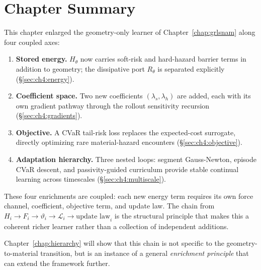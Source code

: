 \section{Chapter Summary}
\label{sec:ch4:summary}

This chapter enlarged the geometry-only learner of
Chapter~\ref{chap:grlsnam} along four coupled axes:

\begin{enumerate}
  \item \textbf{Stored energy.}
        $H_\theta$ now carries soft-risk and hard-hazard barrier terms
        in addition to geometry; the dissipative port $R_\theta$ is
        separated explicitly (\S\ref{sec:ch4:energy}).
  \item \textbf{Coefficient space.}
        Two new coefficients $(\lambda_s, \lambda_h)$ are added, each
        with its own gradient pathway through the rollout sensitivity
        recursion (\S\ref{sec:ch4:gradients}).
  \item \textbf{Objective.}
        A CVaR tail-risk loss replaces the expected-cost surrogate,
        directly optimizing rare material-hazard encounters
        (\S\ref{sec:ch4:objective}).
  \item \textbf{Adaptation hierarchy.}
        Three nested loops: segment Gauss-Newton, episode CVaR descent,
        and passivity-guided curriculum provide stable continual
        learning across timescales (\S\ref{sec:ch4:multiscale}).
\end{enumerate}

These four enrichments are coupled: each new energy term requires its
own force channel, coefficient, objective term, and update law.
The chain from $H_i \to F_i \to \vartheta_i \to \mathcal{L}_i \to
\text{update law}_i$ is the structural principle that makes this
a coherent richer learner rather than a collection of independent
additions.

Chapter~\ref{chap:hierarchy} will show that this chain is not specific
to the geometry-to-material transition, but is an instance of a general
\emph{enrichment principle} that can extend the framework further.